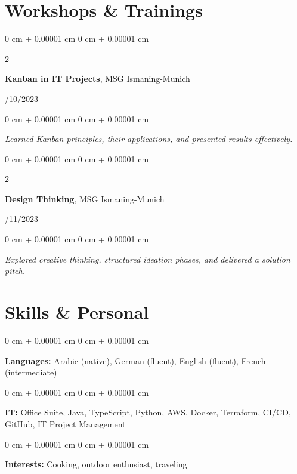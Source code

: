 \documentclass[10pt, letterpaper]{article}
\newenvironment{onecolentry}{
    \begin{adjustwidth}{
        0 cm + 0.00001 cm
    }{
        0 cm + 0.00001 cm
    }
}{
    \end{adjustwidth}
} %
\newenvironment{twocolentry}[2][]{
    \onecolentry
    \def\secondColumn{#2}
    \setcolumnwidth{\fill, 4.5 cm}
    \begin{paracol}{2}
}{
    \switchcolumn \raggedleft \secondColumn
    \end{paracol}
    \endonecolentry
} %
\begin{document}
\vspace{0.2 cm}
        \vspace{0.2 cm}

     
    \section{Workshops \& Trainings}
\begin{twocolentry}{11/10/2023}
\textbf{Kanban in IT Projects}, MSG Ismaning-Munich
\end{twocolentry}
\begin{onecolentry}
\textit{Learned Kanban principles, their applications, and presented results effectively.}
\end{onecolentry}

\vspace{0.2cm}
\begin{twocolentry}{03/11/2023}
\textbf{Design Thinking}, MSG Ismaning-Munich
\end{twocolentry}
\begin{onecolentry}
\textit{Explored creative thinking, structured ideation phases, and delivered a solution pitch.}
\end{onecolentry}    
 \section{Skills \& Personal}

\begin{onecolentry}
\textbf{Languages:} Arabic (native), German (fluent), English (fluent), French (intermediate)
\end{onecolentry}
\vspace{0.1cm}
\begin{onecolentry}
\textbf{IT:} Office Suite, Java, TypeScript, Python, AWS, Docker, Terraform, CI/CD, GitHub, IT Project Management
\end{onecolentry}
\vspace{0.1cm}
\begin{onecolentry}
\textbf{Interests:} Cooking, outdoor enthusiast, traveling
\end{onecolentry}


    
\end{document}
